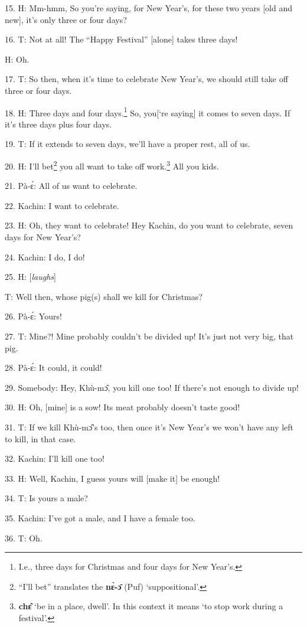 15. H: Mm-hmm, So you're saying, for New Year's, for these two years [old and
new], it's only three or four days?

16. T: Not at all! The ``Happy Festival'' [alone] takes three days!

H: Oh.

17. T: So then, when it's time to celebrate New Year's, we should still take off
three or four days.

18. H: Three days and four days.\footnote{I.e., three days for Christmas and four days for New Year's.} So, you[`re saying] it comes to seven days.
If it's three days plus four days.

19. T: If it extends to seven days, we'll have a proper rest, all of us.

20. H: I'll bet\footnote{``I'll bet'' translates the \textbf{nɛ̀-ɔ̄} (Puf) `suppositional'.} you all want to take off work.\footnote{\textbf{chɛ̂} `be in a place, dwell'. In this context it means `to stop work during a festival'.} All you kids.

21. Pà-ɛ́: All of us want to celebrate.

22. Kachin: I want to celebrate.

23. H: Oh, they want to celebrate! Hey Kachin, do you want to celebrate, seven
days for New Year's?

24. Kachin: I do, I do!

25. H: [\textit{laughs}]

T: Well then, whose pig(s) shall we kill for Christmas?

26. Pà-ɛ́: Yours!

27. T: Mine?! Mine probably couldn't be divided up! It's just not very big, that
pig.

28. Pà-ɛ́: It could, it could!

29. Somebody: Hey, Khù-mɔ̂, you kill one too! If there's not enough to divide
up!

30. H: Oh, [mine] is a sow! Its meat probably doesn't taste good!

31. T: If we kill Khù-mɔ̂'s too, then once it's New Year's we won't have any
left to kill, in that case.

32. Kachin: I'll kill one too!

33. H: Well, Kachin, I guess yours will [make it] be enough!

34. T: Is yours a male?

35. Kachin: I've got a male, and I have a female too.

36. T: Oh.


